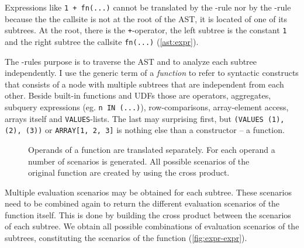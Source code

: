 Expressions like \texttt{1 + fn(...)} cannot be translated by the \RBASE-rule nor by the \RREC-rule because the the callsite is not at the root of the AST, it is located of one of its subtrees. At the root, there is the \texttt{+}-operator, the left subtree is the constant \texttt{1} and the right subtree the callsite \texttt{fn(...)} (\autoref{ast:expr}).

The \REXPR-rules purpose is to traverse the AST and to analyze each subtree independently. I use the generic term of a \textit{function} to refer to syntactic constructs that consists of a node with multiple subtrees that are independent from each other. Beside built-in functions and UDFs those are operators, aggregates, subquery expressions (eg. \texttt{n IN (...)}), row-comparisons, array-element access, arrays itself and \texttt{VALUES}-lists. The last may surprising first, but \texttt{(VALUES (1), (2), (3))} or \texttt{ARRAY[1, 2, 3]} is nothing else than a constructor -- a function.

\begin{figure}[h]
    \centering
    
    \caption{Operands of a function are translated separately. For each operand a number of scenarios is generated. All possible scenarios of the original function are created by using the cross product.}
    \label{fig:expr-expr}
\end{figure}

Multiple evaluation scenarios may be obtained for each subtree. These scenarios need to be combined again to return the different evaluation scenarios of the function itself. This is done by building the cross product between the scenarios of each subtree. We obtain all possible combinations of evaluation scenarios of the subtrees, constituting the scenarios of the function (\autoref{fig:expr-expr}).

\iffalse
$
\inferrule*[Right=(expr)]{
    \inferrule*[Left=(rec)]{ }{
        {\begin{minipage}[b]{15em}
        \texttt{(TRUE, fib($1 - 1)) ->}
        \texttt{({}, {(TRUE, fib($1 - 1))})}
        \end{minipage}}
    }\\
    \inferrule*[Right=(rec)]{ }{
        {\begin{minipage}[b]{15em}
        \texttt{(TRUE, fib($1 - 2)) ->}
        \texttt{({}, {(TRUE, fib($1 - 2))})}
        \end{minipage}}
    }
}{
    {\begin{minipage}[b]{25em}
    \texttt{(TRUE, fib($1 - 1) + fib($1 - 2)) ->}
    \texttt{({}, {(TRUE AND TRUE AND TRUE, fib($1 - 1) + fib($1 - 2))})}
    \end{minipage}}
}
$
\fi


